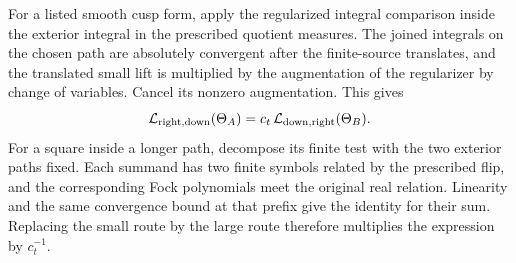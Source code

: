For a listed smooth cusp form, apply the regularized
integral comparison inside the exterior integral
in the prescribed quotient measures. The joined
integrals on the chosen path are absolutely
convergent after the finite-source translates,
and the translated small lift is multiplied by
the augmentation of the regularizer by change
of variables. Cancel its nonzero augmentation.
This gives
\[
 \mathcal L_{\rm right,down}(\Theta_A)
   =c_t\,\mathcal L_{\rm down,right}(\Theta_B).
\]
For a square inside a longer path, decompose its
finite test with the two exterior paths fixed.
Each summand has two finite symbols related
by the prescribed flip, and the corresponding
Fock polynomials meet the original real relation.
Linearity and the same convergence bound at
that prefix give the identity for their sum.
Replacing the small route by the large route
therefore multiplies the expression by \(c_t^{-1}\).


